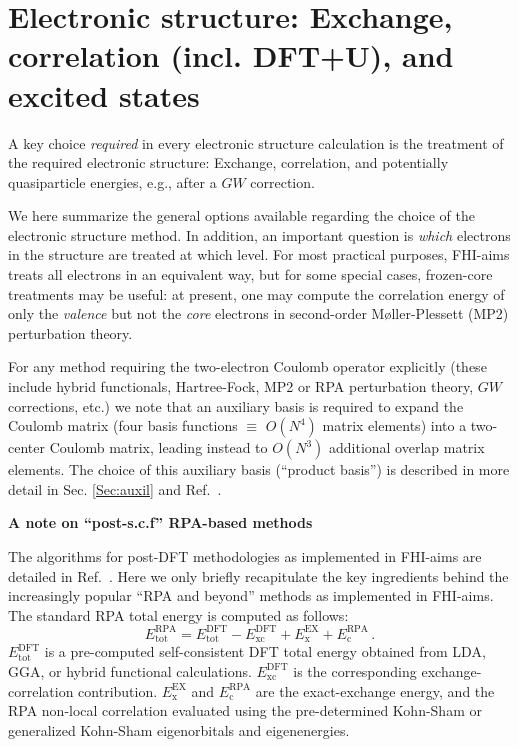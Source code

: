 \section{Electronic structure: Exchange, correlation (incl. DFT+U), and excited states}
\label{Sec:xc}

A key choice \emph{required} in every electronic structure calculation is the
treatment of the required electronic structure: Exchange, correlation,
and potentially quasiparticle energies, e.g., after a $GW$ correction.

We here summarize the general options available regarding the choice
of the electronic structure method. In addition, an important question
is \emph{which} electrons in the structure are treated at which
level. For most practical purposes, FHI-aims treats all electrons in
an equivalent way, but for some special cases, frozen-core treatments
may be useful: at present, one may compute the correlation
energy of only the \emph{valence} but not the \emph{core} electrons in
second-order M{\o}ller-Plessett (MP2) perturbation theory.

For any method requiring the
two-electron Coulomb operator explicitly (these include hybrid
functionals, Hartree-Fock, MP2 or RPA perturbation theory, $GW$
corrections, etc.) we note that an auxiliary basis is required to
expand the Coulomb matrix (four basis functions $\equiv$ $O(N^4)$
matrix elements) into a two-center Coulomb matrix, leading instead to
$O(N^3)$ additional overlap matrix elements. The choice of this
auxiliary basis (``product basis'') is described in more detail in
Sec. \ref{Sec:auxil} and Ref.~\cite{Ren12a}.

\textbf{A note on ``post-s.c.f'' RPA-based methods }

The algorithms for post-DFT methodologies as implemented in FHI-aims
are detailed in Ref.~\cite{Ren12a}. Here we only briefly 
recapitulate the key ingredients behind the increasingly popular 
``RPA and beyond'' methods as implemented in FHI-aims. The standard RPA
total energy is computed as follows:
 \begin{equation}
   E^\text{RPA}_\text{tot} = E^\text{DFT}_\text{tot} - E^\text{DFT}_\text{xc}
        + E^\text{EX}_\text{x} + E^\text{RPA}_\text{c} \, .
  \label{eq:RPA_energy}
 \end{equation}
$E^\text{DFT}_\text{tot}$ is a pre-computed self-consistent DFT total energy
obtained from LDA, GGA, or hybrid functional calculations. $E^\text{DFT}_\text{xc}$
is the corresponding exchange-correlation contribution. $E^\text{EX}_\text{x}$ and
$E^\text{RPA}_\text{c}$ are the exact-exchange energy, and the RPA non-local 
correlation evaluated using the pre-determined Kohn-Sham or generalized Kohn-Sham
eigenorbitals and eigenenergies.

